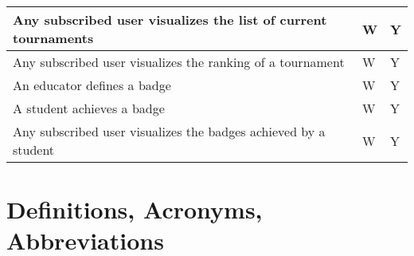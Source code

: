 \begin{center}
\begin{longtable}{|p{8.7cm}|p{3cm}|p{3cm}|}
        Any subscribed user visualizes the list of current tournaments                                                                        & W                      & Y               \\ \hline
        Any subscribed user visualizes the ranking of a tournament                                                                            & W                      & Y               \\ \hline
        An educator defines a badge                                                                                                           & W                      & Y               \\ \hline
        A student achieves a badge                                                                                                            & W                      & Y               \\ \hline
        Any subscribed user visualizes the badges achieved by a student                                                                       & W                      & Y               \\ \hline
    \end{longtable}
\end{center}

\pagebreak

\section{Definitions, Acronyms, Abbreviations}

